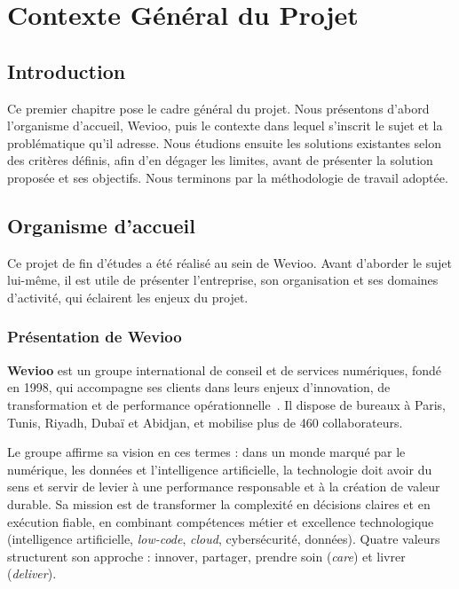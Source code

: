 \chapter{Contexte Général du Projet}

\section*{Introduction}
Ce premier chapitre pose le cadre général du projet. Nous présentons d'abord l'organisme d'accueil, Wevioo, puis le contexte dans lequel s'inscrit le sujet et la problématique qu'il adresse. Nous étudions ensuite les solutions existantes selon des critères définis, afin d'en dégager les limites, avant de présenter la solution proposée et ses objectifs. Nous terminons par la méthodologie de travail adoptée.

\section{Organisme d'accueil}

Ce projet de fin d'études a été réalisé au sein de Wevioo. Avant d'aborder le sujet lui-même, il est utile de présenter l'entreprise, son organisation et ses domaines d'activité, qui éclairent les enjeux du projet.

\subsection{Présentation de Wevioo}

\textbf{Wevioo} est un groupe international de conseil et de services numériques, fondé en 1998, qui accompagne ses clients dans leurs enjeux d'innovation, de transformation et de performance opérationnelle~\cite{wevioo}. Il dispose de bureaux à Paris, Tunis, Riyadh, Dubaï et Abidjan, et mobilise plus de 460 collaborateurs.

Le groupe affirme sa vision en ces termes : dans un monde marqué par le numérique, les données et l'intelligence artificielle, la technologie doit avoir du sens et servir de levier à une performance responsable et à la création de valeur durable. Sa mission est de transformer la complexité en décisions claires et en exécution fiable, en combinant compétences métier et excellence technologique (intelligence artificielle, \textit{low-code}, \textit{cloud}, cybersécurité, données). Quatre valeurs structurent son approche : innover, partager, prendre soin (\textit{care}) et livrer (\textit{deliver}).

